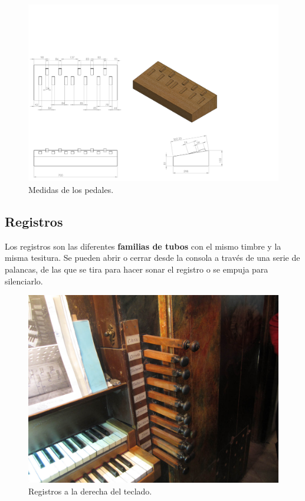 \begin{figure}[H]
	\noindent \begin{centering}
		\includegraphics[width=\linewidth*3/4]{capitulo3/pedalier_modelo}
		\par\end{centering}
	\smallskip
	\caption{\label{fig:pedalier_modelo} Medidas de los pedales.}
\end{figure} 

\smallskip

\subsection{Registros}

Los registros son las diferentes \textbf{familias de tubos} con el mismo timbre y la misma tesitura. Se pueden abrir o cerrar desde la consola a través de una serie de palancas, de las que se tira para hacer sonar el registro o se empuja para silenciarlo.

\smallskip

\begin{figure}[H]
	\noindent \begin{centering}
		\includegraphics[width=\linewidth*2/3]{capitulo3/registros}
		\par\end{centering}
	\smallskip
	\caption{\label{fig:registros} Registros a la derecha del teclado.}
\end{figure} 

